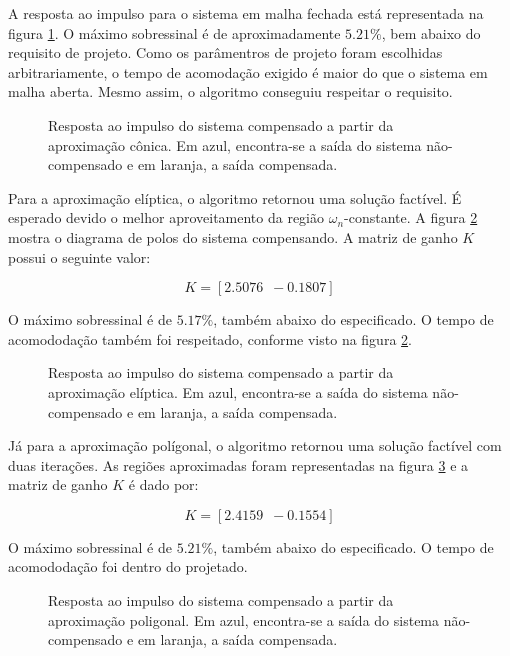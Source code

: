 A resposta ao impulso para o sistema em malha fechada está representada na figura \ref{fig:ImpulseC}. O máximo sobressinal é de aproximadamente $5.21\%$, bem abaixo do requisito de projeto.  Como os parâmentros de projeto foram escolhidas arbitrariamente, o tempo de acomodação exigido é maior do que o sistema em malha aberta. Mesmo assim, o algoritmo conseguiu respeitar o requisito.

\begin{figure}[!ht]
  \centering
  
  \caption{Resposta ao impulso do sistema compensado a partir da aproximação cônica. Em azul, encontra-se a saída do sistema não-compensado e em laranja, a saída compensada.}
  \label{fig:ImpulseC}
\end{figure}

Para a aproximação elíptica, o algoritmo retornou uma solução factível. É esperado devido o melhor aproveitamento da região $\omega_n$-constante. A figura \ref{fig:ImpulseE} mostra o diagrama de polos do sistema compensando. A matriz de ganho $K$ possui o seguinte valor:

\begin{equation}
  K = \left[2.5076 \enspace -0.1807\right]\label{res:GanhoE}
\end{equation}

O máximo sobressinal é de $5.17\%$, também abaixo do especificado. O tempo de acomododação também foi respeitado, conforme visto na figura \ref{fig:ImpulseE}.

\begin{figure}[!ht]
  \centering
  
  \caption{Resposta ao impulso do sistema compensado a partir da aproximação elíptica. Em azul, encontra-se a saída do sistema não-compensado e em laranja, a saída compensada.}
  \label{fig:ImpulseE}
\end{figure}

Já para a aproximação polígonal, o algoritmo retornou uma solução factível com duas iterações. As regiões aproximadas foram representadas na figura \ref{fig:ImpulseP} e a matriz de ganho $K$ é dado por:

\begin{equation}
  K = \left[2.4159 \enspace -0.1554\right]\label{res:GanhoP}
\end{equation}

O máximo sobressinal é de $5.21\%$, também abaixo do especificado. O tempo de acomododação foi dentro do projetado.

\begin{figure}[!ht]
  \centering
  
  \caption{Resposta ao impulso do sistema compensado a partir da aproximação poligonal. Em azul, encontra-se a saída do sistema não-compensado e em laranja, a saída compensada.}
  \label{fig:ImpulseP}
\end{figure}

